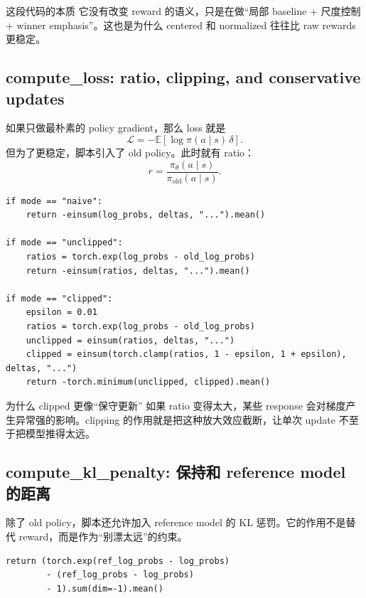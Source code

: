 \documentclass[a4paper]{article}
\begin{document}
\begin{importantbox}{这段代码的本质}
它没有改变 reward 的语义，只是在做“局部 baseline + 尺度控制 + winner emphasis”。这也是为什么 centered 和 normalized 往往比 raw rewards 更稳定。
\end{importantbox}

\subsection{compute\_loss: ratio, clipping, and conservative updates}

如果只做最朴素的 policy gradient，那么 loss 就是
\[
\mathcal{L} = -\mathbb{E}[\log \pi(a \mid s)\,\delta].
\]
但为了更稳定，脚本引入了 old policy。此时就有 ratio：
\[
r = \frac{\pi_\theta(a\mid s)}{\pi_{\text{old}}(a\mid s)}.
\]

\begin{lstlisting}[caption={compute\_loss: naive / unclipped / clipped}]
if mode == "naive":
    return -einsum(log_probs, deltas, "...").mean()

if mode == "unclipped":
    ratios = torch.exp(log_probs - old_log_probs)
    return -einsum(ratios, deltas, "...").mean()

if mode == "clipped":
    epsilon = 0.01
    ratios = torch.exp(log_probs - old_log_probs)
    unclipped = einsum(ratios, deltas, "...")
    clipped = einsum(torch.clamp(ratios, 1 - epsilon, 1 + epsilon), deltas, "...")
    return -torch.minimum(unclipped, clipped).mean()
\end{lstlisting}

\begin{warningbox}{为什么 clipped 更像“保守更新”}
如果 ratio 变得太大，某些 response 会对梯度产生异常强的影响。clipping 的作用就是把这种放大效应截断，让单次 update 不至于把模型推得太远。
\end{warningbox}

\subsection{compute\_kl\_penalty: 保持和 reference model 的距离}

除了 old policy，脚本还允许加入 reference model 的 KL 惩罚。它的作用不是替代 reward，而是作为“别漂太远”的约束。

\begin{lstlisting}[caption={compute\_kl\_penalty}]
return (torch.exp(ref_log_probs - log_probs)
        - (ref_log_probs - log_probs)
        - 1).sum(dim=-1).mean()
\end{lstlisting}
\end{document}

